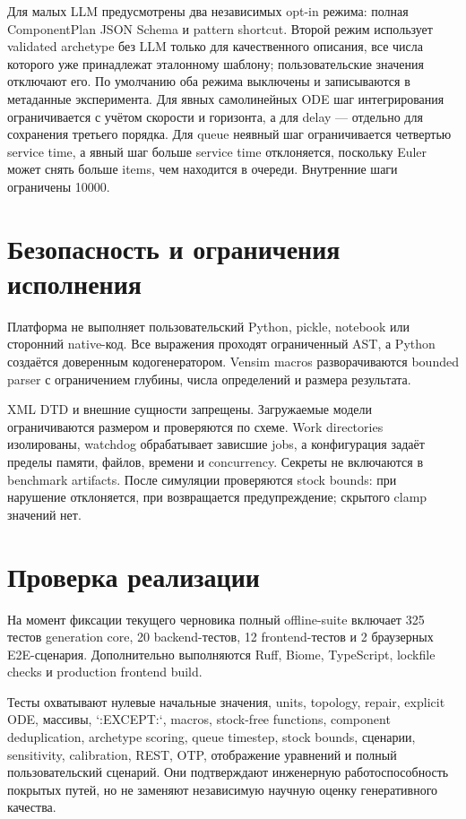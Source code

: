 Для малых LLM предусмотрены два независимых opt-in режима: полная ComponentPlan JSON Schema и pattern shortcut. Второй режим использует validated archetype без LLM только для качественного описания, все числа которого уже принадлежат эталонному шаблону; пользовательские значения отключают его. По умолчанию оба режима выключены и записываются в метаданные эксперимента. Для явных самолинейных ODE шаг интегрирования ограничивается с учётом скорости и горизонта, а для delay --- отдельно для сохранения третьего порядка. Для queue неявный шаг ограничивается четвертью service time, а явный шаг больше service time отклоняется, поскольку Euler может снять больше items, чем находится в очереди. Внутренние шаги ограничены 10000.

\section{Безопасность и ограничения исполнения}

Платформа не выполняет пользовательский Python, pickle, notebook или сторонний native-код. Все выражения проходят ограниченный AST, а Python создаётся доверенным кодогенератором. Vensim macros разворачиваются bounded parser с ограничением глубины, числа определений и размера результата.

XML DTD и внешние сущности запрещены. Загружаемые модели ограничиваются размером и проверяются по схеме. Work directories изолированы, watchdog обрабатывает зависшие jobs, а конфигурация задаёт пределы памяти, файлов, времени и concurrency. Секреты не включаются в benchmark artifacts. После симуляции проверяются stock bounds: при  нарушение отклоняется, при  возвращается предупреждение; скрытого clamp значений нет.

\section{Проверка реализации}

На момент фиксации текущего черновика полный offline-suite включает 325 тестов generation core, 20 backend-тестов, 12 frontend-тестов и 2 браузерных E2E-сценария. Дополнительно выполняются Ruff, Biome, TypeScript, lockfile checks и production frontend build.

Тесты охватывают нулевые начальные значения, units, topology, repair, explicit ODE, массивы, `:EXCEPT:`, macros, stock-free functions, component deduplication, archetype scoring, queue timestep, stock bounds, сценарии, sensitivity, calibration, REST, OTP, отображение уравнений и полный пользовательский сценарий. Они подтверждают инженерную работоспособность покрытых путей, но не заменяют независимую научную оценку генеративного качества.
